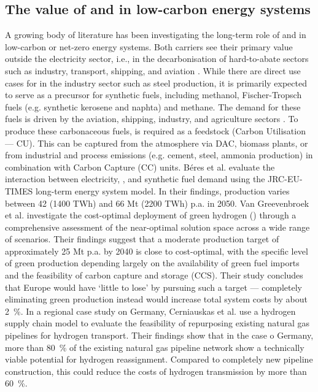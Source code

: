 \documentclass[preprint,12pt,sort&compress]{elsarticle}
\begin{document}
\subsection{The value of  and  in low-carbon energy systems} 
A growing body of literature has been investigating the long-term role of  and  in low-carbon or net-zero energy systems. Both carriers see their primary value outside the electricity sector, i.e., in the decarbonisation of hard-to-abate sectors such as industry, transport, shipping, and aviation \cite{reigstadMovingLowcarbonHydrogen2022}. While there are direct use cases for  in the industry sector such as steel production, it is primarily expected to serve as a precursor for synthetic fuels, including methanol, Fischer-Tropsch fuels (e.g. synthetic kerosene and naphta) and methane. The demand for these fuels is driven by the aviation, shipping, industry, and agriculture sectors \cite{neumannPotentialRoleHydrogen2023}. To produce these carbonaceous fuels,  is required as a feedstock (Carbon Utilisation --- CU). This  can be captured from the atmosphere via DAC, biomass plants, or from industrial and process emissions (e.g. cement, steel, ammonia production) in combination with Carbon Capture (CC) units.
Béres et al. \cite{beresWillHydrogenSynthetic2024} evaluate the interaction between electricity, , and synthetic fuel demand using the JRC-EU-TIMES long-term energy system model. In their findings,  production varies between 42 (1400 TWh) and 66 Mt (2200 TWh) p.a. in 2050. 
Van Greevenbroek et al. \cite{vangreevenbroekLittleLoseCase2025} investigate the cost-optimal deployment of green hydrogen () through a comprehensive assessment of the near-optimal solution space across a wide range of scenarios. Their findings suggest that a moderate production target of approximately 25 Mt p.a. by 2040 is close to cost-optimal, with the specific level of green  production depending largely on the availability of green fuel imports and the feasibility of carbon capture and storage (CCS). Their study concludes that Europe would have `little to lose' by pursuing such a target --- completely eliminating green  production instead would increase total system costs by about \SI{2}{\percent}.
In a regional case study on Germany, Cerniauskas et al. \cite{cerniauskasOptionsNaturalGas2020} use a hydrogen supply chain model \cite{reussSeasonalStorageAlternative2017} to evaluate the feasibility of repurposing existing natural gas pipelines for hydrogen transport. Their findings show that in the case o Germany, more than \SI{80}{\percent} of the existing natural gas pipeline network show a technically viable potential for hydrogen reassignment. Compared to completely new pipeline construction, this could reduce the costs of hydrogen transmission by more than \SI{60}{\percent}.
\end{document}
